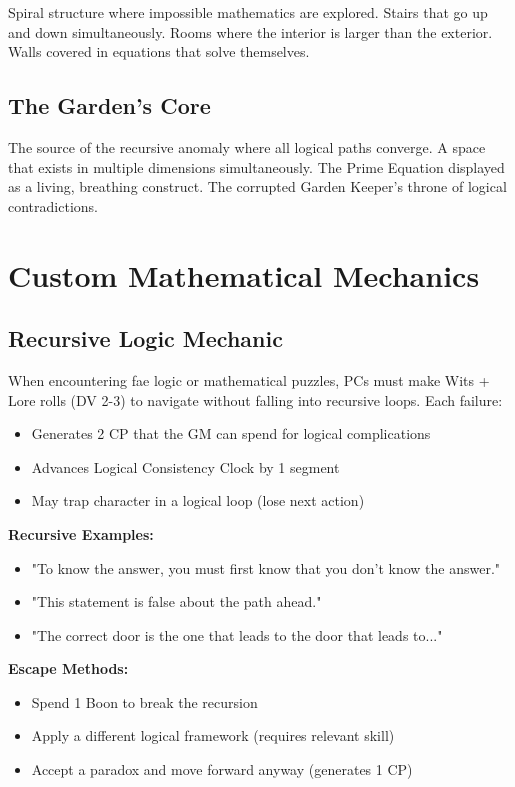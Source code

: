 \documentclass[11pt]{article}
\begin{document}
Spiral structure where impossible mathematics are explored. Stairs that go up and down simultaneously. Rooms where the interior is larger than the exterior. Walls covered in equations that solve themselves.

\subsection{The Garden's Core}

The source of the recursive anomaly where all logical paths converge. A space that exists in multiple dimensions simultaneously. The Prime Equation displayed as a living, breathing construct. The corrupted Garden Keeper's throne of logical contradictions.

\section{Custom Mathematical Mechanics}

\subsection{Recursive Logic Mechanic}

When encountering fae logic or mathematical puzzles, PCs must make Wits + Lore rolls (DV 2-3) to navigate without falling into recursive loops. Each failure:
\begin{itemize}
\item Generates 2 CP that the GM can spend for logical complications
\item Advances Logical Consistency Clock by 1 segment
\item May trap character in a logical loop (lose next action)
\end{itemize}

\textbf{Recursive Examples:}
\begin{itemize}
\item "To know the answer, you must first know that you don't know the answer."
\item "This statement is false about the path ahead."
\item "The correct door is the one that leads to the door that leads to..."
\end{itemize}

\textbf{Escape Methods:}
\begin{itemize}
\item Spend 1 Boon to break the recursion
\item Apply a different logical framework (requires relevant skill)
\item Accept a paradox and move forward anyway (generates 1 CP)
\end{itemize}
\end{document}
